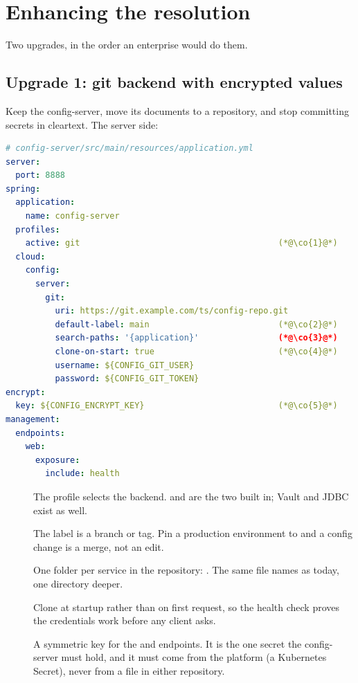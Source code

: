 \section{Enhancing the resolution}
\label{sec:config-enhance}

Two upgrades, in the order an enterprise would do them.

\subsection{Upgrade 1: git backend with encrypted values}

Keep the config-server, move its documents to a repository, and stop
committing secrets in cleartext. The server side:

\begin{lstlisting}[language=yaml]
# config-server/src/main/resources/application.yml
server:
  port: 8888
spring:
  application:
    name: config-server
  profiles:
    active: git                                        (*@\co{1}@*)
  cloud:
    config:
      server:
        git:
          uri: https://git.example.com/ts/config-repo.git
          default-label: main                          (*@\co{2}@*)
          search-paths: '{application}'                (*@\co{3}@*)
          clone-on-start: true                         (*@\co{4}@*)
          username: ${CONFIG_GIT_USER}
          password: ${CONFIG_GIT_TOKEN}
encrypt:
  key: ${CONFIG_ENCRYPT_KEY}                           (*@\co{5}@*)
management:
  endpoints:
    web:
      exposure:
        include: health
\end{lstlisting}

\begin{description}
  \item[] The profile selects the backend.  and
   are the two built in; Vault and JDBC exist as well.
  \item[] The label is a branch or tag. Pin a production
  environment to  and a config change is a merge,
  not an edit.
  \item[] One folder per service in the repository:
  . The same file names as today,
  one directory deeper.
  \item[] Clone at startup rather than on first request, so the
  health check proves the credentials work before any client asks.
  \item[] A symmetric key for the  and
   endpoints. It is the one secret the config-server must
  hold, and it must come from the platform (a Kubernetes Secret), never
  from a file in either repository.
\end{description}

